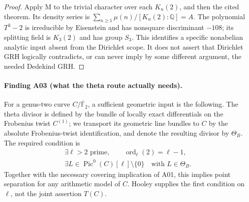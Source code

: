 \documentclass[11pt,a4paper]{article}
\begin{document}
\begin{proof}
Apply M to the trivial character over each $K_n(2)$, and then the
cited theorem. Its density series is
$\sum_{n\ge1}\mu(n)/[K_n(2):\mathbb Q]=A$. The polynomial $T^3-2$
is irreducible by Eisenstein and has nonsquare discriminant $-108$;
its splitting field is $K_3(2)$ and has group $S_3$. This identifies
a specific nonabelian analytic input absent from the Dirichlet scope.
It does not assert that Dirichlet GRH logically contradicts, or can
never imply by some different argument, the needed Dedekind GRH.
\end{proof}

\paragraph{Finding A03 (what the theta route actually needs).}
For a genus-two curve $C/\overline{\mathbb F}_2$, a sufficient geometric
input is the following. The theta divisor is defined by the bundle of
locally exact differentials on the Frobenius twist $C^{(1)}$; we
transport its geometric line bundles to $C$ by the absolute
Frobenius-twist identification, and denote the resulting divisor by
$\Theta_B$. The required condition is
\[
 \begin{gathered}
 \exists\ell>2\text{ prime},\qquad \operatorname{ord}_{\ell}(2)=\ell-1,\\
 \exists L\in\operatorname{Pic}^0(C)[\ell]\setminus\{0\}
                  \quad\text{with }L\in\Theta_B.
 \end{gathered}
 \tag{T(C)}
\]
Together with the necessary covering implication of A01, this implies
point separation for any arithmetic model of $C$. Hooley supplies the
first condition on $\ell$, not the joint assertion $T(C)$.
\end{document}
